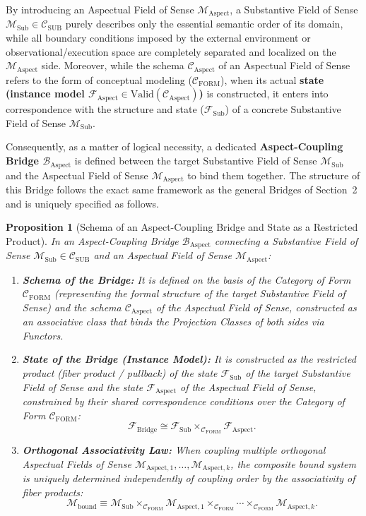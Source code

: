 \documentclass[11pt,a4paper]{article}
\theoremstyle{definition}
\theoremstyle{plain}
\newtheorem{proposition}{Proposition}[section]
\theoremstyle{remark}
\newcommand{\Valid}{\mathrm{Valid}}
\newcommand{\CFORM}{\mathcal{C}_{\mathrm{FORM}}}
\newcommand{\CSUB}{\mathcal{C}_{\mathrm{SUB}}}
\newcommand{\CAspect}{\mathcal{C}_{\mathrm{Aspect}}}
\newcommand{\MAspect}{\mathcal{M}_{\mathrm{Aspect}}}
\newcommand{\MSub}{\mathcal{M}_{\mathrm{Sub}}}
\newcommand{\BAspect}{\mathcal{B}_{\mathrm{Aspect}}}
\begin{document}
By introducing an Aspectual Field of Sense $\MAspect$, a Substantive Field of Sense $\MSub \in \CSUB$ purely describes only the essential semantic order of its domain, while all boundary conditions imposed by the external environment or observational/execution space are completely separated and localized on the $\MAspect$ side. Moreover, while the schema $\CAspect$ of an Aspectual Field of Sense refers to the form of conceptual modeling ($\CFORM$), when its actual \textbf{state (instance model $\mathcal{F}_{\mathrm{Aspect}} \in \Valid(\CAspect)$)} is constructed, it enters into correspondence with the structure and state ($\mathcal{F}_{\mathrm{Sub}}$) of a concrete Substantive Field of Sense $\MSub$.

Consequently, as a matter of logical necessity, a dedicated \textbf{Aspect-Coupling Bridge $\BAspect$} is defined between the target Substantive Field of Sense $\MSub$ and the Aspectual Field of Sense $\MAspect$ to bind them together. The structure of this Bridge follows the exact same framework as the general Bridges of Section~2 and is uniquely specified as follows.

\begin{proposition}[Schema of an Aspect-Coupling Bridge and State as a Restricted Product]\label{prop:aspect-coupling}
In an Aspect-Coupling Bridge $\BAspect$ connecting a Substantive Field of Sense $\MSub \in \CSUB$ and an Aspectual Field of Sense $\MAspect$:

\begin{enumerate}
    \item \textbf{Schema of the Bridge:} It is defined on the basis of the Category of Form $\CFORM$ (representing the formal structure of the target Substantive Field of Sense) and the schema $\CAspect$ of the Aspectual Field of Sense, constructed as an associative class that binds the Projection Classes of both sides via Functors.
    \item \textbf{State of the Bridge (Instance Model):} It is constructed as the restricted product (fiber product / pullback) of the state $\mathcal{F}_{\mathrm{Sub}}$ of the target Substantive Field of Sense and the state $\mathcal{F}_{\mathrm{Aspect}}$ of the Aspectual Field of Sense, constrained by their shared correspondence conditions over the Category of Form $\CFORM$:
    \begin{equation}
    \mathcal{F}_{\mathrm{Bridge}} \cong \mathcal{F}_{\mathrm{Sub}} \times_{\CFORM} \mathcal{F}_{\mathrm{Aspect}}.
    \end{equation}
    \item \textbf{Orthogonal Associativity Law:} When coupling multiple orthogonal Aspectual Fields of Sense $\mathcal{M}_{\mathrm{Aspect}, 1}, \dots, \mathcal{M}_{\mathrm{Aspect}, k}$, the composite bound system is uniquely determined independently of coupling order by the associativity of fiber products:
    \begin{equation}
    \mathcal{M}_{\mathrm{bound}} \equiv \MSub \times_{\CFORM} \mathcal{M}_{\mathrm{Aspect}, 1} \times_{\CFORM} \cdots \times_{\CFORM} \mathcal{M}_{\mathrm{Aspect}, k}.
    \end{equation}
\end{enumerate}
\end{proposition}
\end{document}
